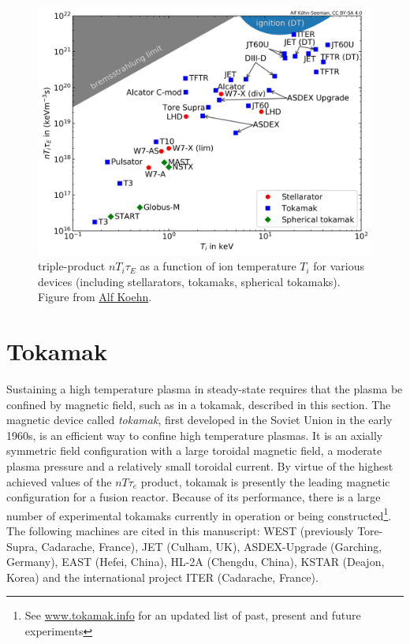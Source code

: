 \begin{figure} 
	\begin{center}
		\includegraphics[width=1.0\textwidth]{figures/chap1/nTtau_machines.png}
		\caption{triple-product $n T_i \tau_E$ as a function of ion temperature $T_i$ for various devices (including stellarators, tokamaks, spherical tokamaks). Figure from \href{https://github.com/alfkoehn/fusion_plots/releases/tag/v1.0.0}{Alf Koehn}.}
		\label{fig:chap1:nTtau_machines}
	\end{center}
\end{figure}



\section{Tokamak}
Sustaining a high temperature plasma in steady-state requires that the plasma be confined by magnetic field, such as in a tokamak, described in this section. The magnetic device called \emph{tokamak}, first developed in the Soviet Union in the early 1960s, is an efficient way to confine high temperature plasmas. It is an axially symmetric field configuration with a large toroidal magnetic field, a moderate plasma pressure and a relatively small toroidal current\cite{Freidberg2007}. By virtue of the highest achieved values of the $n T \tau_e$ product, tokamak is presently the leading magnetic configuration for a fusion reactor. Because of its performance, there is a large number of experimental tokamaks currently in operation or being constructed\footnote{See \href{http://www.tokamak.info/}{www.tokamak.info} for an updated list of past, present and future experiments}. The following machines are cited in this manuscript: WEST (previously Tore-Supra, Cadarache, France), JET (Culham, UK), ASDEX-Upgrade (Garching, Germany), EAST (Hefei, China), HL-2A (Chengdu, China), KSTAR (Deajon, Korea) and the international project ITER (Cadarache, France).

